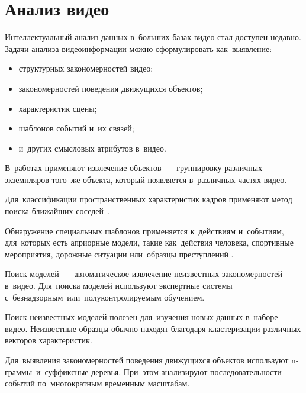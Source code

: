 
\section{Анализ видео}

Интеллектуальный анализ данных в~больших базах видео стал доступен недавно.
Задачи анализа видеоинформации можно сформулировать как~выявление:
\begin{itemize}
    \item структурных закономерностей видео;
    \item закономерностей поведения движущихся объектов;
    \item характеристик сцены;
    \item шаблонов событий и~их связей;
    \item и~других смысловых атрибутов в~видео.
\end{itemize}

В~работах применяют извлечение объектов~— группировку различных экземпляров
того~же объекта, который появляется в~различных частях видео.

Для~классификации пространственных характеристик кадров применяют
метод поиска ближайших соседей\
\cite{Anjulan:2009}.

Обнаружение специальных шаблонов применяется к~действиям и~событиям,
для~которых есть априорные модели, такие как~действия человека,
спортивные мероприятия, дорожные ситуации
или~образцы преступлений \cite{Quack:2006}.

Поиск моделей~— автоматическое извлечение неизвестных закономерностей в~видео.
Для~поиска моделей используют экспертные системы
с~безнадзорным\
или~полуконтролируемым обучением.

Поиск неизвестных моделей полезен
для~изучения новых данных в~наборе видео.
Неизвестные образцы обычно находят благодаря
кластеризации различных векторов характеристик.

Для~выявления закономерностей поведения движущихся объектов
используют n-граммы\ и~суффиксные
деревья\index{Суффиксное дерево}.
При~этом анализируют последовательности событий
по~многократным временным масштабам.
